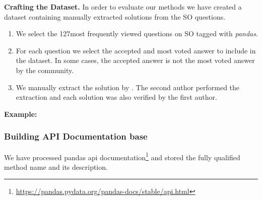 \newcommand{\topquestions}{127}

\textbf{Crafting the Dataset.}
In order to evaluate our methods we have created a dataset containing manually extracted solutions from the SO questions.  

\begin{enumerate}
	\item We select the \topquestions most frequently viewed questions on SO tagged with \textit{pandas}. 
    \item For each question we select the accepted and most voted answer to include in the dataset. In some cases, the accepted answer is not the most voted answer by the community.
    \item We manually extract the solution by . The second author performed the extraction and each solution was also verified by the first author.  

\end{enumerate}




       

\textbf{Example:}

\subsubsection{Building API Documentation base}
We have processed pandas api documentation\footnote{\url{https://pandas.pydata.org/pandas-docs/stable/api.html}} and stored the fully qualified method name and its description.